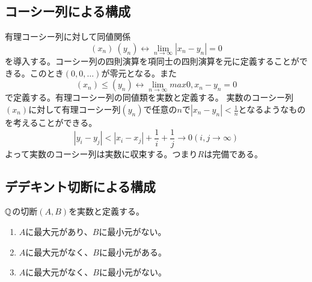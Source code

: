 \subsection{コーシー列による構成}
	有理コーシー列に対して同値関係
		\[(x_n) ~ (y_n) \leftrightarrow \lim_{n \to \infty} |x_n - y_n| = 0\]
	を導入する。コーシー列の四則演算を項同士の四則演算を元に定義することができる。このとき$(0, 0, \ldots)$が零元となる。また
		\[(x_n) \leq (y_n) \leftrightarrow \lim_{n \to \infty} max{0, x_n - y_n} = 0\]
	で定義する。有理コーシー列の同値類を実数と定義する。
	実数のコーシー列$(x_n)$に対して有理コーシー列$(y_n)$で任意の$n$で$|x_n - y_n| < \frac{1}{n}$となるようなものを考えることができる。
		\[|y_i - y_j| < |x_i - x_j| + \frac{1}{i} + \frac{1}{j} \to 0 (i, j \to \infty)\]
	よって実数のコーシー列は実数に収束する。つまり$R$は完備である。

\subsection{デデキント切断による構成}
	$\mathbb{Q}$の切断$(A, B)$を実数と定義する。
	\begin{enumerate}
		\item $A$に最大元があり、$B$に最小元がない。
		\item $A$に最大元がなく、$B$に最小元がある。
		\item $A$に最大元がなく、$B$に最小元がない。
	\end{enumerate}
